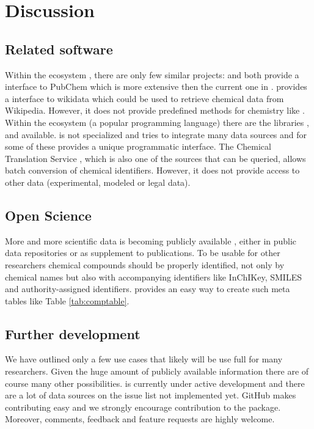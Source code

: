\documentclass[article, shortnames]{jss}\usepackage[]{graphicx}\usepackage[]{color}
\begin{document}
\section[Discussion]{Discussion}
\subsection[Related software]{Related software}
Within the  ecosystem , there are only few similar projects:
 \citep{rpubchem_2014} and  \citep{chemminer_2008}  both provide a interface to PubChem which is more extensive then the current one in .
 \citep{wikidatar_2016} provides a interface to wikidata which could be used to retrieve chemical data from Wikipedia.
However, it does not provide predefined methods for chemistry like .
Within the  ecosystem (a popular programming language) there are the libraries  \citep{pubchempy},  \citep{chemspipy} and  \citep{cirpy} available.
 is not specialized and tries to integrate many data sources and for some of these provides a unique programmatic interface.
The Chemical Translation Service \citep{Wohlgemuth_Haldiya_Willighagen_Kind_Fiehn_2010}, which is also one of the sources that can be queried,  allows batch conversion of chemical identifiers.
However, it does not provide access to other data (experimental, modeled or legal data).


\subsection[Open Science]{Open Science}
More and more scientific data is becoming publicly available \citep{Gewin_2016, Reichman_Jones_Schildhauer_2011,Boyle_Guha_2011}, either in public data repositories or as supplement to publications.
To be usable for other researchers chemical compounds should be properly identified, not only by chemical names but also with accompanying identifiers like InChIKey, SMILES and authority-assigned identifiers.
 provides an easy way to create such meta tables like Table \ref{tab:comptable}.


\subsection[Further development]{Further development}
We have outlined only a few use cases that likely will be use full for many researchers.
Given the huge amount of publicly available information there are of course many other possibilities.
 is currently under active development and there are a lot of data sources on the issue list not implemented yet.
GitHub makes contributing easy and we strongly encourage contribution to the package.
Moreover, comments, feedback and feature requests are highly welcome.
\end{document}

